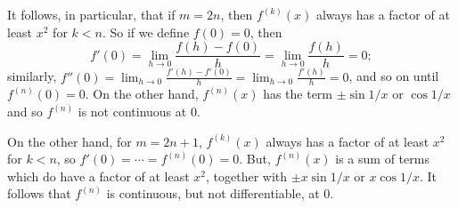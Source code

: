 \documentclass{article}
\begin{document}
It follows, in particular, that if $m = 2n$, then $f^{(k)}(x)$ always has a
factor of at least $x^2$ for $k < n$. So if we define $f(0) = 0$, then \[
  f'(0)
  = \lim_{h \to 0} \frac{f(h) - f(0)}{h}
  = \lim_{h \to 0} \frac{f(h)}{h} = 0;
\] similarly, $f''(0) = \lim_{h \to 0} \frac{f'(h) - f'(0)}{h} = \lim_{h \to 0}
\frac{f'(h)}{h} = 0$, and so on until $f^{(n)}(0) = 0$. On the other hand,
$f^{(n)}(x)$ has the term $\pm \sin{1/x}$ or $\cos{1/x}$ and so $f^{(n)}$ is
not continuous at 0.

On the other hand, for $m = 2n + 1$, $f^{(k)}(x)$ always has a factor of at
least $x^2$ for $k < n$, so $f'(0) = \cdots = f^{(n)}(0) = 0$. But,
$f^{(n)}(x)$ is a sum of terms which do have a factor of at least $x^2$,
together with $\pm x\sin{1/x}$ or $x\cos{1/x}$. It follows that $f^{(n)}$ is
continuous, but not differentiable, at 0.
\end{document}
